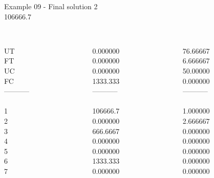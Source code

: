 \begin{frame}{Example 09 - Final solution}
\footnotesize
{} 2 \\
  106666.7\\

\begin{columns}[t]
\begin{column}{0.3\textwidth}
\\
UT\\
FT\\
UC\\
FC\\
-----------\\
\\
1\\
2\\
3\\
4\\
5\\
6\\
7\\

\end{column}
\begin{column}{0.3\textwidth}
\\
0.000000\\
0.000000\\
0.000000\\
1333.333\\

-----------\\
\\
106666.7\\
0.000000\\
666.6667\\
0.000000\\
0.000000\\
1333.333\\
0.000000\\

\end{column}

\begin{column}{0.3\textwidth}
\\
76.66667\\
6.666667\\
50.00000\\
0.000000\\


-----------\\
\\
1.000000\\
2.666667\\
0.000000\\
0.000000\\
0.000000\\
0.000000\\
0.000000\\

\end{column}
\end{columns}
\end{frame}
